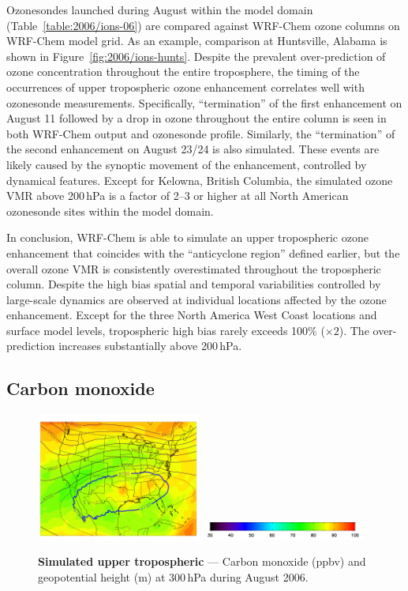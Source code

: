 Ozonesondes launched during August within the model domain (Table~\ref{table:2006/ions-06}) are compared against WRF-Chem ozone columns on
WRF-Chem model grid. As an example, comparison at Huntsville, Alabama is shown in \mbox{Figure~\ref{fig:2006/ions-hunts}}. Despite the prevalent over-prediction
of ozone concentration throughout the entire troposphere, the timing of the occurrences of upper tropospheric ozone enhancement correlates well
with ozonesonde measurements. Specifically, ``termination'' of the first enhancement on August 11 followed by a drop in ozone throughout the entire column
is seen in both WRF-Chem output and ozonesonde profile. Similarly, the ``termination'' of the second enhancement on August 23/24 is also simulated. These
events are likely caused by the synoptic movement of the enhancement, controlled by dynamical features. Except for Kelowna, British Columbia, the simulated
ozone VMR above 200\,\unit{hPa} is a factor of 2--3 or higher at all North American ozonesonde sites within the model domain.

In conclusion, WRF-Chem is able to simulate an upper tropospheric ozone enhancement that coincides with the ``anticyclone region'' defined earlier, but the
overall ozone VMR is consistently overestimated throughout the tropospheric column. Despite the high bias spatial and temporal variabilities controlled by
large-scale dynamics are observed at individual locations affected by the ozone enhancement. Except for the three North America West Coast locations and
surface model levels, tropospheric high bias rarely exceeds 100\% ($\times2$). The over-prediction increases substantially above 200\,\unit{hPa}.

\subsection{Carbon monoxide}\label{ssec:2006/gen/co}

	\begin{figure}
		\centering
		\begin{singlespacing}
		\vspace{-.15in}
		\includegraphics[width=0.48\textwidth]{co/co08_300hPa}
		\includegraphics[width=0.48\textwidth]{o3/o3_colorbar}
		\caption[Simulated August  at 300\,\unit{hPa}]{{\small\textbf{Simulated upper tropospheric } --- Carbon monoxide
		(\unit{ppbv}) and geopotential height (\unit{m}) at 300\,\unit{hPa} during August 2006.}}
		\label{fig:2006/co_300}
		\end{singlespacing}
	\end{figure}
	
